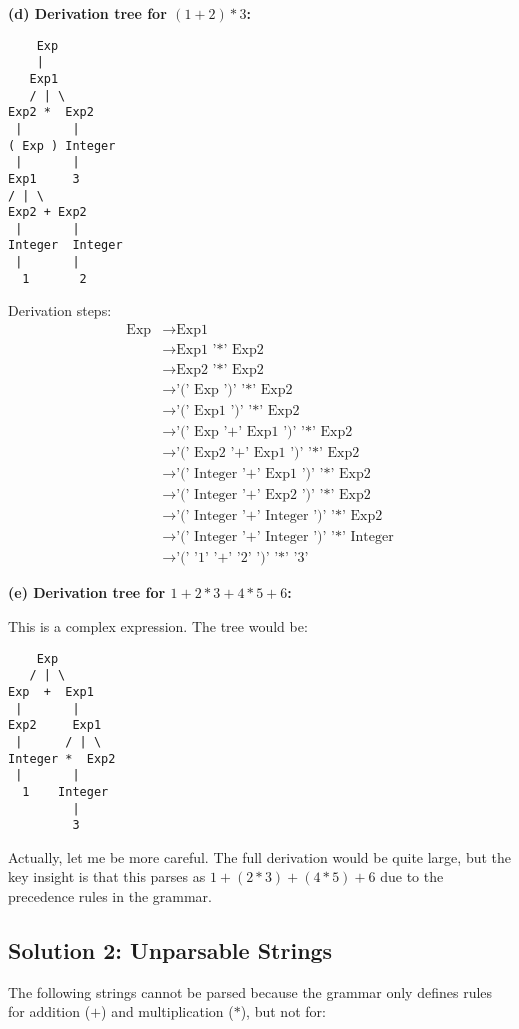 \documentclass{article}
\theoremstyle{plain}
\theoremstyle{definition}
\theoremstyle{remark}
\begin{document}
\textbf{(d) Derivation tree for $(1+2)*3$:}

\begin{verbatim}
    Exp
    |
   Exp1
   / | \
Exp2 *  Exp2
 |       |
( Exp ) Integer
 |       |
Exp1     3
/ | \
Exp2 + Exp2
 |       |
Integer  Integer
 |       |
  1       2
\end{verbatim}

Derivation steps:
\begin{align}
\text{Exp} &\to \text{Exp1} \\
&\to \text{Exp1 '*' Exp2} \\
&\to \text{Exp2 '*' Exp2} \\
&\to \text{'(' Exp ')' '*' Exp2} \\
&\to \text{'(' Exp1 ')' '*' Exp2} \\
&\to \text{'(' Exp '+' Exp1 ')' '*' Exp2} \\
&\to \text{'(' Exp2 '+' Exp1 ')' '*' Exp2} \\
&\to \text{'(' Integer '+' Exp1 ')' '*' Exp2} \\
&\to \text{'(' Integer '+' Exp2 ')' '*' Exp2} \\
&\to \text{'(' Integer '+' Integer ')' '*' Exp2} \\
&\to \text{'(' Integer '+' Integer ')' '*' Integer} \\
&\to \text{'(' '1' '+' '2' ')' '*' '3'}
\end{align}

\textbf{(e) Derivation tree for $1+2*3+4*5+6$:}

This is a complex expression. The tree would be:

\begin{verbatim}
    Exp
   / | \
Exp  +  Exp1
 |       |
Exp2     Exp1
 |      / | \
Integer *  Exp2
 |       |
  1    Integer
         |
         3
\end{verbatim}

Actually, let me be more careful. The full derivation would be quite large, but the key insight is that this parses as $1 + (2*3) + (4*5) + 6$ due to the precedence rules in the grammar.

\subsection{Solution 2: Unparsable Strings}

The following strings cannot be parsed because the grammar only defines rules for addition ($+$) and multiplication ($*$), but not for:
\end{document}
